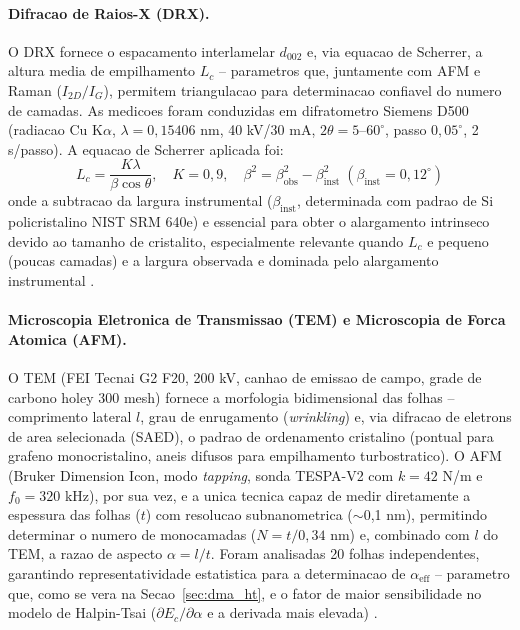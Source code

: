 \documentclass[11pt,a4paper,oneside]{article}
\begin{document}
\paragraph{Difracao de Raios-X (DRX).} O DRX fornece o espacamento interlamelar $d_{002}$ e,
via equacao de Scherrer, a altura media de empilhamento $L_c$ -- parametros que, juntamente com
AFM e Raman ($I_{2D}/I_G$), permitem triangulacao para determinacao confiavel do numero de
camadas. As medicoes foram conduzidas em difratometro Siemens D500 (radiacao Cu K$\alpha$,
$\lambda{=}0{,}15406$ nm, 40 kV/30 mA, $2\theta{=}5$--$60^{\circ}$, passo $0{,}05^{\circ}$,
2 s/passo). A equacao de Scherrer aplicada foi:
\begin{equation}
L_c = \frac{K\lambda}{\beta\cos\theta},\quad K{=}0{,}9,\quad \beta^2{=}\beta^2_{\text{obs}}{-}\beta^2_{\text{inst}}\;(\beta_{\text{inst}}{=}0{,}12^{\circ})
\end{equation}
onde a subtracao da largura instrumental ($\beta_{\text{inst}}$, determinada com padrao de Si
policristalino NIST SRM 640e) e essencial para obter o alargamento intrinseco devido ao
tamanho de cristalito, especialmente relevante quando $L_c$ e pequeno (poucas camadas) e a
largura observada e dominada pelo alargamento instrumental \cite{Faria2017}.

\paragraph{Microscopia Eletronica de Transmissao (TEM) e Microscopia de Forca Atomica (AFM).}
O TEM (FEI Tecnai G2 F20, 200 kV, canhao de emissao de campo, grade de carbono holey 300 mesh)
fornece a morfologia bidimensional das folhas -- comprimento lateral $l$, grau de enrugamento
(\textit{wrinkling}) e, via difracao de eletrons de area selecionada (SAED), o padrao de
ordenamento cristalino (pontual para grafeno monocristalino, aneis difusos para empilhamento
turbostratico). O AFM (Bruker Dimension Icon, modo \textit{tapping}, sonda TESPA-V2 com
$k{=}42$ N/m e $f_0{=}320$ kHz), por sua vez, e a unica tecnica capaz de medir diretamente a
espessura das folhas ($t$) com resolucao subnanometrica (${\sim}$0,1 nm), permitindo determinar
o numero de monocamadas ($N{=}t/0{,}34$ nm) e, combinado com $l$ do TEM, a razao de aspecto
$\alpha{=}l/t$. Foram analisadas 20 folhas independentes, garantindo representatividade
estatistica para a determinacao de $\alpha_{\text{eff}}$ -- parametro que, como se vera na
Secao~\ref{sec:dma_ht}, e o fator de maior sensibilidade no modelo de Halpin-Tsai
($\partial E_c/\partial\alpha$ e a derivada mais elevada) \cite{Lee2008, Young2012}.
\end{document}
